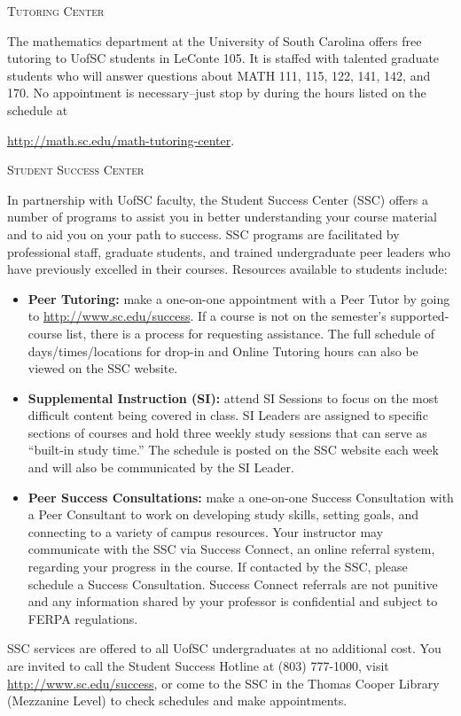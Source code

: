 \documentclass[teaching.portfolio.tex]{subfiles}
\begin{document}
\begin{center}
  \textsc{Tutoring Center}
\end{center}
\noindent
The mathematics department at the University of South Carolina offers free tutoring to UofSC students in LeConte 105.
It is staffed with talented graduate students who will answer questions about MATH 111, 115, 122, 141, 142, and 170.
No appointment is necessary--just stop by during the hours listed on the schedule at
\begin{center}
  \url{http://math.sc.edu/math-tutoring-center}.
\end{center}

\begin{center}
  \textsc{Student Success Center}
\end{center}
\noindent
In partnership with UofSC faculty, the Student Success Center (SSC) offers a number of programs to assist you in better understanding your course material and to aid you on your path to success. 
SSC programs are facilitated by professional staff, graduate students, and trained undergraduate peer leaders who have previously excelled in their courses.
Resources available to students include: 
\begin{itemize}
\item 
  \textbf{Peer Tutoring:} make a one-on-one appointment with a Peer Tutor by going to \url{http://www.sc.edu/success}. 
  If a course is not on the semester’s supported-course list, there is a process for requesting assistance. 
  The full schedule of days/times/locations for drop-in and Online Tutoring hours can also be viewed on the SSC website.
\item
  \textbf{Supplemental Instruction (SI):} attend SI Sessions to focus on the most difficult content being covered in class. 
  SI Leaders are assigned to specific sections of courses and hold three weekly study sessions that can serve as “built-in study time.” 
  The schedule is posted on the SSC website each week and will also be communicated by the SI Leader.
\item
  \textbf{Peer Success Consultations:} make a one-on-one Success Consultation with a Peer Consultant to work on developing study skills, setting goals, and connecting to a variety of campus resources. 
  Your instructor may communicate with the SSC via Success Connect, an online referral system, regarding your progress in the course. 
  If contacted by the SSC, please schedule a Success Consultation. 
  Success Connect referrals are not punitive and any information shared by your professor is confidential and subject to FERPA regulations.
\end{itemize}
SSC services are offered to all UofSC undergraduates at no additional cost.
You are invited to call the Student Success Hotline at (803) 777-1000, visit \url{http://www.sc.edu/success}, or come to the SSC in the Thomas Cooper Library (Mezzanine Level) to check schedules and make appointments. 
\end{document}
